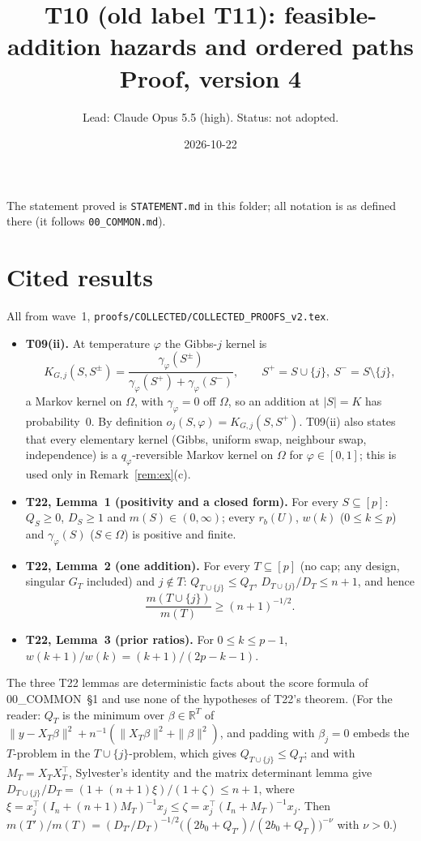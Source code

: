 \documentclass[11pt]{article}
\title{T10 (old label T11): feasible-addition hazards and ordered paths\\[2pt]\large Proof, version 4}
\author{Lead: Claude Opus 5.5 (high). Status: not adopted.}
\date{2026-10-22}
\theoremstyle{definition}
\newcommand{\Om}{\Omega}
\newcommand{\ph}{\varphi}
\begin{document}
\maketitle

\noindent The statement proved is \texttt{STATEMENT.md} in this folder; all notation is as defined there (it follows \texttt{00\_COMMON.md}).

\section{Cited results}\label{sec:det}

All from wave~1, \texttt{proofs/COLLECTED/COLLECTED\_PROOFS\_v2.tex}.
\begin{itemize}
\item \textbf{T09(ii).} At temperature $\ph$ the Gibbs-$j$ kernel is
\begin{equation}\label{eq:gibbs}
K_{G,j}(S,S^{\pm})=\frac{\gamma_\ph(S^{\pm})}{\gamma_\ph(S^+)+\gamma_\ph(S^-)},\qquad S^+=S\cup\{j\},\ S^-=S\setminus\{j\},
\end{equation}
a Markov kernel on $\Om$, with $\gamma_\ph=0$ off $\Om$, so an addition at $|S|=K$ has probability~$0$. By definition $o_j(S,\ph)=K_{G,j}(S,S^+)$. T09(ii) also states that every elementary kernel (Gibbs, uniform swap, neighbour swap, independence) is a $q_\ph$-reversible Markov kernel on $\Om$ for $\ph\in[0,1]$; this is used only in Remark~\ref{rem:ex}(c).
\item \textbf{T22, Lemma~1 (positivity and a closed form).} For every $S\subseteq[p]$: $Q_S\ge0$, $D_S\ge1$ and $m(S)\in(0,\infty)$; every $r_b(U)$, $w(k)$ ($0\le k\le p$) and $\gamma_\ph(S)$ ($S\in\Om$) is positive and finite.
\item \textbf{T22, Lemma~2 (one addition).} For every $T\subseteq[p]$ (no cap; any design, singular $G_T$ included) and $j\notin T$: $Q_{T\cup\{j\}}\le Q_T$, $D_{T\cup\{j\}}/D_T\le n+1$, and hence
\begin{equation}\label{eq:floor}
\frac{m(T\cup\{j\})}{m(T)}\ge(n+1)^{-1/2}.
\end{equation}
\item \textbf{T22, Lemma~3 (prior ratios).} For $0\le k\le p-1$, $w(k+1)/w(k)=(k+1)/(2p-k-1)$.
\end{itemize}
The three T22 lemmas are deterministic facts about the score formula of 00\_COMMON~\S1 and use none of the hypotheses of T22's theorem. (For the reader: $Q_T$ is the minimum over $\beta\in\mathbb R^T$ of $\|y-X_T\beta\|^2+n^{-1}(\|X_T\beta\|^2+\|\beta\|^2)$, and padding with $\beta_j=0$ embeds the $T$-problem in the $T\cup\{j\}$-problem, which gives $Q_{T\cup\{j\}}\le Q_T$; and with $M_T=X_TX_T^\top$, Sylvester's identity and the matrix determinant lemma give $D_{T\cup\{j\}}/D_T=(1+(n+1)\xi)/(1+\zeta)\le n+1$, where $\xi=x_j^\top(I_n+(n+1)M_T)^{-1}x_j\le\zeta=x_j^\top(I_n+M_T)^{-1}x_j$. Then $m(T')/m(T)=(D_{T'}/D_T)^{-1/2}\big((2b_0+Q_{T'})/(2b_0+Q_T)\big)^{-\nu}$ with $\nu>0$.)
\end{document}
